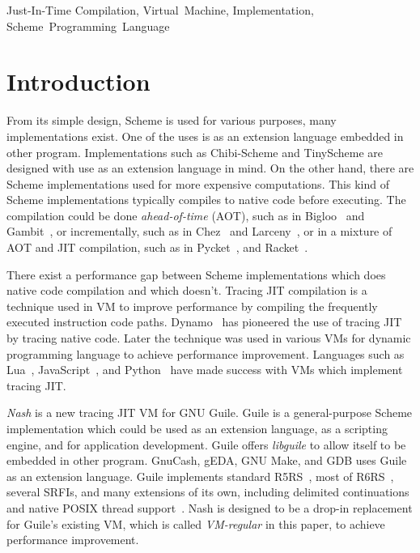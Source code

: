 \documentclass[preprint, 10pt]{sigplanconf}
\begin{document}


\keywords{} Just-In-Time Compilation, Virtual~Machine, Implementation,
Scheme~Programming~Language

\section{Introduction}

From its simple design, Scheme is used for various purposes, many
implementations exist. One of the uses is as an extension language embedded in
other program. Implementations such as Chibi-Scheme and TinyScheme are designed
with use as an extension language in mind. On the other hand, there are Scheme
implementations used for more expensive computations. This kind of Scheme
implementations typically compiles to native code before executing. The
compilation could be done \textit{ahead-of-time} (AOT), such as in
Bigloo~\cite{serrano1995bigloo} and Gambit~\cite{feeley1998gambit}, or
incrementally, such as in Chez~\cite{dybvig2006development} and
Larceny~\cite{hansen1992impact}, or in a mixture of AOT and JIT compilation,
such as in Pycket~\cite{bauman2015pycket}, and Racket~\cite{flatt2013racket}.

There exist a performance gap between Scheme implementations which does native
code compilation and which doesn't. Tracing JIT compilation is a technique used
in VM to improve performance by compiling the frequently executed instruction
code paths. Dynamo~\cite{bala2000dynamo} has pioneered the use of tracing JIT by
tracing native code. Later the technique was used in various VMs for dynamic
programming language to achieve performance improvement. Languages such as
Lua~\cite{pall2016luajit}, JavaScript~\cite{gal2009trace}, and
Python~\cite{bolz2009tracing} have made success with VMs which implement tracing
JIT.\@

\textit{Nash} is a new tracing JIT VM for GNU Guile. Guile is a general-purpose
Scheme implementation which could be used as an extension language, as a
scripting engine, and for application development. Guile offers
\textit{libguile} to allow itself to be embedded in other program. GnuCash,
gEDA, GNU Make, and GDB uses Guile as an extension language. Guile implements
standard R5RS~\cite{abelson1998revised5}, most of
R6RS~\cite{sperber2010revised}, several SRFIs, and many extensions of its own,
including delimited continuations and native POSIX thread
support~\cite{Galassi02guilereference}. Nash is designed to be a drop-in
replacement for Guile's existing VM, which is called \textit{VM-regular} in this
paper, to achieve performance improvement.
\end{document}
